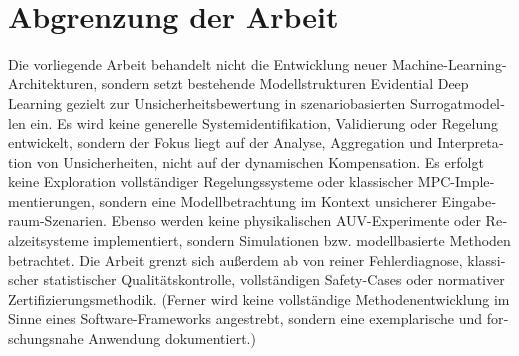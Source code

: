 \begin{otherlanguage}{ngerman}
~\parencite{Pandey.30.11.2022}


\section{Abgrenzung der Arbeit}

Die vorliegende Arbeit behandelt nicht die Entwicklung neuer Machine-Learning-Architekturen, sondern setzt bestehende Modellstrukturen Evidential Deep Learning gezielt zur Unsicherheitsbewertung in szenariobasierten Surrogatmodellen ein. Es wird keine generelle Systemidentifikation, Validierung oder Regelung entwickelt, sondern der Fokus liegt auf der Analyse, Aggregation und Interpretation von Unsicherheiten, nicht auf der dynamischen Kompensation.
Es erfolgt keine Exploration vollständiger Regelungssysteme oder klassischer MPC-Implementierungen, sondern eine Modellbetrachtung im Kontext unsicherer Eingaberaum-Szenarien. Ebenso werden keine physikalischen AUV-Experimente oder Realzeitsysteme implementiert, sondern Simulationen bzw. modellbasierte Methoden betrachtet. Die Arbeit grenzt sich außerdem ab von reiner Fehlerdiagnose, klassischer statistischer Qualitätskontrolle, vollständigen Safety-Cases oder normativer Zertifizierungsmethodik. (Ferner wird keine vollständige Methodenentwicklung im Sinne eines Software-Frameworks angestrebt, sondern eine exemplarische und forschungsnahe Anwendung dokumentiert.)
\end{otherlanguage}
